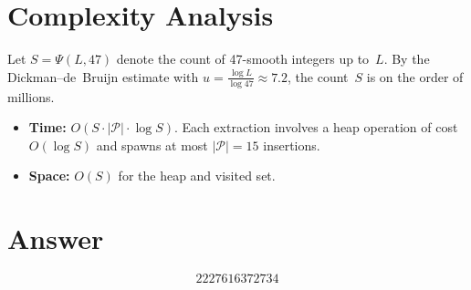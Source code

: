 \documentclass[12pt]{article}
\theoremstyle{definition}
\begin{document}
\section{Complexity Analysis}

Let $S = \Psi(L, 47)$ denote the count of 47-smooth integers up to~$L$. By the Dickman--de~Bruijn estimate with $u = \frac{\log L}{\log 47} \approx 7.2$, the count~$S$ is on the order of millions.

\begin{itemize}
\item \textbf{Time:} $O(S \cdot |\mathcal{P}| \cdot \log S)$. Each extraction involves a heap operation of cost $O(\log S)$ and spawns at most $|\mathcal{P}| = 15$ insertions.
\item \textbf{Space:} $O(S)$ for the heap and visited set.
\end{itemize}

\section{Answer}

\[
\boxed{2227616372734}
\]
\end{document}
